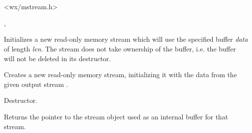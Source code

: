 \section{}\label{wxmeminputstream}




<wx/mstream.h>


, 


\label{wxmemoryinputstreamctor}


Initializes a new read-only memory stream which will use the specified buffer
{\it data} of length {\it len}. The stream does not take ownership of the 
buffer, i.e. the buffer will not be deleted in its destructor.


Creates a new read-only memory stream, initializing it with the
data from the given output stream .

\label{wxmemoryinputstreamdtor}


Destructor.

\label{wxmemoryinputstreamgetistrmbuf}


Returns the pointer to the stream object used as an internal buffer
for that stream.


